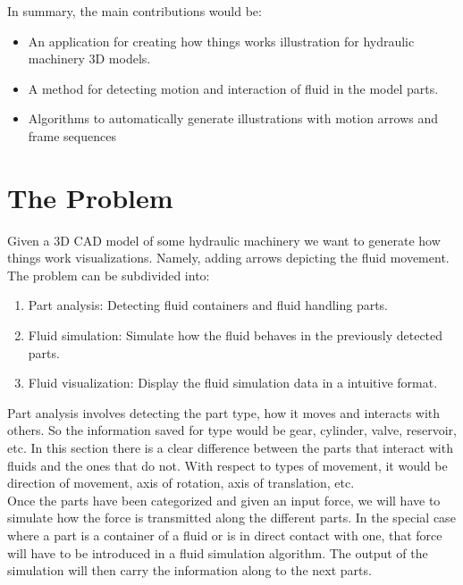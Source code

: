 \documentclass[11pt]{report}
\begin{document}
In summary, the main contributions would be:
\begin{itemize}
\item An application for creating how things works illustration for hydraulic machinery 3D models.
\item A method for detecting motion and interaction of fluid in the model parts.
\item Algorithms to automatically generate illustrations with motion arrows and frame sequences
\end{itemize}


\section{The Problem}
\label{sec:problem}

Given a 3D CAD model of some hydraulic machinery we want to generate how things work visualizations.
Namely, adding arrows depicting the fluid movement.\\

The problem can be subdivided into:
\begin{enumerate}
\item Part analysis: Detecting fluid containers and fluid handling parts.
\item Fluid simulation: Simulate how the fluid behaves in the previously detected parts.
\item Fluid visualization: Display the fluid simulation data in a intuitive format.\\
\end{enumerate}

Part analysis involves detecting the part type, how it moves and interacts with others.
So the information saved for type would be gear, cylinder, valve, reservoir, etc.
In this section there is a clear difference between the parts that interact with fluids and the ones that do not. 
With respect to types of movement, it would be direction of movement, axis of rotation, axis of translation, etc.\\

Once the parts have been categorized and given an input force, we will have to simulate how the force is transmitted along the different parts.
In the special case where a part is a container of a fluid or is in direct contact with one, that force will have to be introduced in a fluid simulation algorithm.
The output of the simulation will then carry the information along to the next parts.\\
\end{document}
